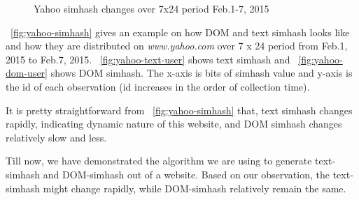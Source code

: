 \begin{figure}[t]
  \centering
  \caption{Yahoo simhash changes over 7x24 period Feb.1-7, 2015}
  \label{fig:yahoo-simhash}
\end{figure}

~\autoref{fig:yahoo-simhash} gives an example on how DOM and text simhash looks
like and how they are distributed on {\it www.yahoo.com} over 7 x 24 period from
Feb.1, 2015 to Feb.7, 2015. ~\autoref{fig:yahoo-text-user} shows text simhash
and ~\autoref{fig:yahoo-dom-user} shows DOM simhash. The x-axis is bits of simhash value and
y-axis is the id of each observation (id increases in the order of collection time).

It is pretty straightforward from ~\autoref{fig:yahoo-simhash} that,
text simhash changes rapidly, indicating dynamic nature of this
website, and DOM simhash changes relatively slow and less.

Till now, we have demonstrated the algorithm we are using to generate
text-simhash and DOM-simhash out of a website. Based on our observation, the
text-simhash might change rapidly, while DOM-simhash relatively remain the same.

